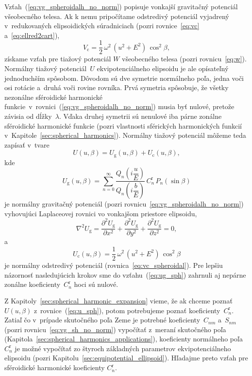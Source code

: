 \documentclass[a4paper,12pt]{book}
\newcommand{\gidx}{\mathrm g}
\newcommand{\cidx}{\mathrm c}
\begin{document}
Vzťah~(\ref{eq:vg_spheroidalh_no_norm}) popisuje vonkajší gravitačný potenciál 
všeobecného telesa.  Ak k nemu pripočítame odstredivý potenciál vyjadrený 
v~redukovaných elipsoidických súradniciach (pozri rovnice~\ref{eq:vc} 
a~\ref{eq:ellred2cart}),
%
\begin{equation}
\label{eq:vc_spheroidal}
V_\cidx = \frac{1}{2} \, \omega^2 \, (u^2 + E^2) \, \cos^2\beta{,}
\end{equation}
%
získame vzťah pre tiažový potenciál $W$ všeobecného telesa (pozri 
rovnicu~\ref{eq:w}).  Normálny tiažový potenciál~$U$ ekvipotenciálneho 
elipsoidu je ale opísateľný jednoduchším spôsobom.  Dôvodom sú dve symetrie 
normálneho poľa, jedna voči osi rotácie a~druhá voči rovine rovníka.  Prvá 
symetria spôsobuje, že všetky nezonálne sféroidické harmonické 
funkcie~v~rovnici~(\ref{eq:vg_spheroidalh_no_norm}) musia byť nulové, pretože 
závisia od dĺžky~$\lambda$.  Vďaka druhej symetrii sú nenulové iba párne 
zonálne sféroidické harmonické funkcie (pozri vlastnosti sférických 
harmonických funkcií v~Kapitole~\ref{sec:spherical_harmonics}).  Normálny 
tiažový potenciál môžeme teda zapísať v~tvare
%
\begin{equation}
\label{eq:u_sph}
U(u, \beta) = U_\gidx(u, \beta) + U_\cidx(u, \beta){,}
\end{equation}
%
kde
%
\begin{equation}
\label{eq:ug_sph}
U_\gidx(u, \beta) = \sum_{n = 0}^\infty \frac{Q_n\left( i \dfrac{u}{E} 
\right)}{Q_n\left( i \dfrac{b}{E} \right)} \,  C^{\mathrm{r}}_n \, 
P_n(\sin\beta)
\end{equation}
%
je normálny gravitačný potenciál (pozri 
rovnicu~\ref{eq:vg_spheroidalh_no_norm}) vyhovujúci Laplaceovej rovnici vo 
vonkajšom priestore elipsoidu,
%
\begin{equation}
\label{eq:ug_laplace_cart}
\nabla^2 U_\gidx = \frac{\partial^2 U_\gidx}{\partial x^2} + \frac{\partial^2 
U_\gidx}{\partial y^2} + \frac{\partial^2 U_\gidx}{\partial z^2} = 0{,}
\end{equation}
%
a
%
\begin{equation}
\label{eq:uc_sph}
U_\cidx(u, \beta) = \frac{1}{2} \, \omega^2 \, (u^2 + E^2) \, \cos^2\beta
\end{equation}
%
je normálny odstredivý potenciál (rovnica~\ref{eq:vc_spheroidal}).  Pre lepšiu 
názornosť nasledujúcich krokov sme do vzťahu~(\ref{eq:ug_sph}) zahrnuli aj 
nepárne zonálne koeficienty~$C^{\mathrm{r}}_n$ hoci sú nulové.

Z Kapitoly~\ref{sec:spherical_harmonic_expansion} vieme, že ak chceme poznať 
$U(u,\beta)$ z~rovnice~(\ref{eq:u_sph}), potom potrebujeme poznať 
koeficienty~$C_n^\mathrm{r}$.  Zatiaľ čo v~prípade skutočného poľa Zeme je 
potrebné koeficienty~$C_{nm}$ a~$S_{nm}$ (pozri rovnicu~\ref{eq:vg_sh_no_norm}) 
vypočítať z~meraní skutočného poľa 
(Kapitola~\ref{sec:spherical_harmonics_applications}), koeficienty normálneho 
poľa $C_n^\mathrm{r}$ je možné vypočítať zo štyroch základných parametrov 
ekvipotenciálneho elipsoidu (pozri Kapitolu~\ref{sec:equipotential_ellipsoid}).  
Hľadajme preto vzťah pre sféroidické harmonické koeficienty $C_n^\mathrm{r}$.
\end{document}

